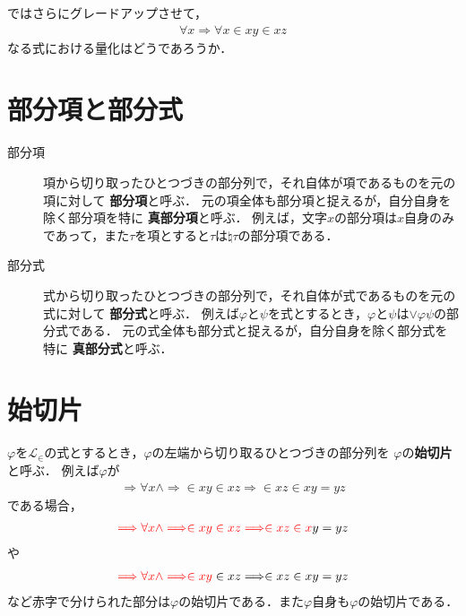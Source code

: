 	ではさらにグレードアップさせて，
	\begin{align}
		\forall x \Longrightarrow \forall x \in x y \in x z
	\end{align}
	なる式における量化はどうであろうか．
	
\section{部分項と部分式}
	\begin{description}
		\item[部分項]
			項から切り取ったひとつづきの部分列で，それ自体が項であるものを元の項に対して
			{\bf 部分項}と呼ぶ．
			元の項全体も部分項と捉えるが，自分自身を除く部分項を特に
			{\bf 真部分項}と呼ぶ．
			例えば，文字$x$の部分項は$x$自身のみであって，また$\tau$を項とすると$\tau$は$\natural \tau$の部分項である．
		
		\item[部分式]
			式から切り取ったひとつづきの部分列で，それ自体が式であるものを元の式に対して
			{\bf 部分式}と呼ぶ．
			例えば$\varphi$と$\psi$を式とするとき，$\varphi$と$\psi$は$\vee \varphi \psi$の部分式である．
			元の式全体も部分式と捉えるが，自分自身を除く部分式を特に
			{\bf 真部分式}と呼ぶ．
	\end{description}
	
\section{始切片}
	$\varphi$を$\mathcal{L}_{\in}$の式とするとき，$\varphi$の左端から切り取るひとつづきの部分列を
	$\varphi$の{\bf 始切片}と呼ぶ．
	例えば$\varphi$が
	\begin{align}
		\Longrightarrow \forall x \wedge \Longrightarrow \in xy \in xz \Longrightarrow \in xz \in xy = yz
	\end{align}
	である場合，
	\begin{align}
		\textcolor{red}{\Longrightarrow \forall x \wedge \Longrightarrow \in xy \in xz \Longrightarrow \in xz \in x}y = yz
	\end{align}
	や
	\begin{align}
		\textcolor{red}{\Longrightarrow \forall x \wedge \Longrightarrow \in xy} \in xz \Longrightarrow \in xz \in xy = yz
	\end{align}
	など赤字で分けられた部分は$\varphi$の始切片である．また$\varphi$自身も$\varphi$の始切片である．
	
